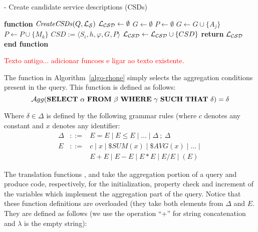 \begin{algorithm}
\caption{ - Create candidate service descriptions (CSDs)}
\label{creatingcsds}
\begin{algorithmic}[1]
\STATE \textbf{function} $\mathit{CreateCSDs} (Q, \hbox{${\cal L_{S}}$})$
\STATE $\hbox{${\cal L_{CSD}}$} \leftarrow \emptyset$
		\STATE $G \leftarrow \emptyset$	
		\STATE $P \leftarrow \emptyset$		
			\STATE $G \leftarrow G \cup \lbrace A_{j} \rbrace$ 
		\ENDFOR
			\STATE $P \leftarrow P \cup \lbrace M_{k} \rbrace$ 
		\ENDFOR
		\STATE $CSD := \langle S_{i}, h, \varphi, G, P \rangle$	
		\STATE $\hbox{${\cal L_{CSD}}$} \leftarrow \hbox{${\cal L_{CSD}}$} \cup \lbrace CSD \rbrace$	
	\ENDIF
\ENDFOR
\STATE \textbf{return} $\hbox{${\cal L_{CSD}}$}$
\STATE \textbf{end function}
\end{algorithmic}
\end{algorithm}


\textcolor{red}{Texto antigo... adicionar funcoes e ligar ao texto existente.} 
 
 The function \agg{\_} in Algorithm~\ref{algo-rhone} simply selects the aggregation conditions present in the query. 
This function is defined as follows:
\[
\agg{\mathbf{SELECT}\ \alpha\ \mathbf{FROM}\ \beta\ \mathbf{WHERE}\ \gamma\ \mathbf{SUCH\ THAT}\ \delta} = \delta 
\]

Where $\delta \in \Delta$ is defined by the following grammar rules (where $c$ denotes any constant and $x$ denotes any identifier:
\begin{eqnarray*}
\Delta & ::= & E = E \mid E \leq E \mid \dots \mid \Delta\ ;\ \Delta   \\
E      & ::= & c \mid x \mid \$\mathit{SUM(x)} \mid \$\mathit{AVG(x)} \mid \dots \mid \\
       &     & E + E \mid E - E \mid E * E \mid E / E \mid ( E )
\end{eqnarray*}

The translation functions \tqI{\_}, \tqT{\_} and \tqS{\_} take the aggregation portion of a query and produce code, respectively, for the initialization, property check and increment of the variables which implement the aggregation part of the query.
Notice that these function definitions are overloaded (they take both elements from $\Delta$ and $E$.
They are defined as follows (we use the operation ``+'' for string concatenation and $\lambda$ is the empty string):

